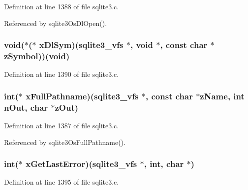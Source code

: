 Definition at line 1388 of file sqlite3.\+c.



Referenced by sqlite3\+Os\+Dl\+Open().

\hypertarget{structsqlite3__vfs_ae43e7134858d88b6104cef2a4aef72d4}{}
\subsubsection[{x\+Dl\+Sym}]{\setlength{\rightskip}{0pt plus 5cm}void($\ast$($\ast$ x\+Dl\+Sym)({\bf sqlite3\+\_\+vfs} $\ast$, void $\ast$, const char $\ast$z\+Symbol))(void)}\label{structsqlite3__vfs_ae43e7134858d88b6104cef2a4aef72d4}


Definition at line 1390 of file sqlite3.\+c.

\hypertarget{structsqlite3__vfs_ae25f89e6402cb0f9cb50eaafa663c7a1}{}
\subsubsection[{x\+Full\+Pathname}]{\setlength{\rightskip}{0pt plus 5cm}int($\ast$ x\+Full\+Pathname)({\bf sqlite3\+\_\+vfs} $\ast$, const char $\ast${\bf z\+Name}, int n\+Out, char $\ast$z\+Out)}\label{structsqlite3__vfs_ae25f89e6402cb0f9cb50eaafa663c7a1}


Definition at line 1387 of file sqlite3.\+c.



Referenced by sqlite3\+Os\+Full\+Pathname().

\hypertarget{structsqlite3__vfs_a489cbf27a20784bc30fec3bf363e62b2}{}
\subsubsection[{x\+Get\+Last\+Error}]{\setlength{\rightskip}{0pt plus 5cm}int($\ast$ x\+Get\+Last\+Error)({\bf sqlite3\+\_\+vfs} $\ast$, int, char $\ast$)}\label{structsqlite3__vfs_a489cbf27a20784bc30fec3bf363e62b2}


Definition at line 1395 of file sqlite3.\+c.

\hypertarget{structsqlite3__vfs_a1a9847423eacc3a0b3f529bc6cef940e}{}
